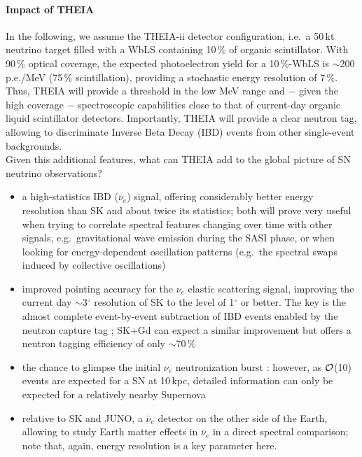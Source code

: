 \paragraph{Impact of THEIA} In the following, we assume the THEIA-ii detector configuration, i.e.~a 50\,kt neutrino target filled with a WbLS containing 10\,\% of organic scintillator. With 90\,\% optical coverage, the expected photoelectron yield for a 10\,\%-WbLS is $\sim$200\,p.e./MeV (75\,\% scintillation), providing a stochastic energy resolution of 7\,\%. Thus, THEIA will provide a threshold in the low MeV range and $-$ given the high coverage $-$ spectroscopic capabilities close to that of current-day organic liquid scintillator detectors. Importantly, THEIA will provide a clear neutron tag, allowing to discriminate Inverse Beta Decay (IBD) events from other single-event backgrounds.
\medskip\\
Given this additional features, what can THEIA add to the global picture of SN neutrino observations? 
\begin{itemize}
\item a high-statistics IBD ($\bar\nu_e$) signal, offering considerably better energy resolution than SK and about twice its statistics; both will prove very useful when trying to correlate spectral features changing over time with other signals, e.g.~gravitational wave emission during the SASI phase, or when looking for energy-dependent oscillation patterns (e.g.~the spectral swaps induced by collective oscillations)
\item improved pointing accuracy for the $\nu_e$ elastic scattering signal, improving the current day $\sim$3$^\circ$ resolution of SK to the level of 1$^\circ$ or better. The key is the almost complete event-by-event subtraction of IBD events enabled by the neutron capture tag \cite{Tomas:2003xn}; SK+Gd can expect a similar improvement but offers a neutron tagging efficiency of only $\sim$70\,\%
\item the chance to glimpse the initial $\nu_e$ neutronization burst \cite{Kachelriess:2004ds}: however, as $\cal O$(10) events are expected for a SN at 10\,kpc, detailed information can only be expected for a relatively nearby Supernova
\item relative to SK and JUNO, a $\bar\nu_e$ detector on the other side of the Earth, allowing to study Earth matter effects in $\bar\nu_e$ in a direct spectral comparison; note that, again, energy resolution is a key parameter here.
\end{itemize}

